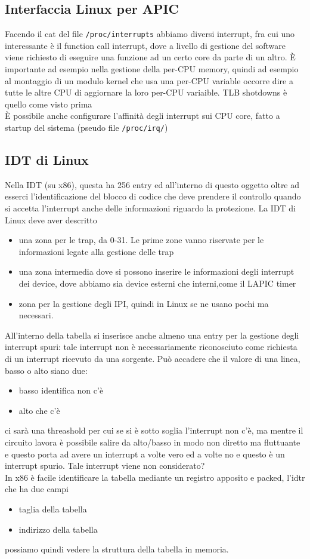 \documentclass[12pt, oneside]{extbook}
\begin{document}
\subsection{Interfaccia Linux per APIC}
Facendo il cat del file \texttt{/proc/interrupts} abbiamo diversi interrupt, fra cui uno interessante è il function call interrupt, dove a livello di gestione del software viene richiesto di eseguire una funzione ad un certo core da parte di un altro. È importante ad esempio nella gestione della per-CPU memory, quindi ad esempio al montaggio di un modulo kernel che usa una per-CPU variable occorre dire a tutte le altre CPU di aggiornare la loro per-CPU variaible. TLB shotdowns è quello come visto prima\\ È possibile anche configurare l'affinità degli interrupt sui CPU core, fatto a startup del sistema (pseudo file \texttt{/proc/irq/})
\subsection{IDT di Linux}
Nella IDT (su x86), questa ha 256 entry ed all'interno di questo oggetto oltre ad esserci l'identificazione del blocco di codice che deve prendere il controllo quando si accetta l'interrupt anche delle informazioni riguardo la protezione. La IDT di Linux deve aver descritto 
\begin{itemize}
\item una zona per le trap, da 0-31. Le prime zone vanno riservate per le informazioni legate alla gestione delle trap
\item una zona intermedia dove si possono inserire le informazioni degli interrupt dei device, dove abbiamo sia device esterni che interni,come il LAPIC timer
\item zona per la gestione degli IPI, quindi in Linux se ne usano pochi ma necessari.
\end{itemize}
All'interno della tabella si inserisce anche almeno una entry per la gestione degli interrupt spuri: tale interrupt non è necessariamente riconosciuto come richiesta di un interrupt ricevuto da una sorgente. Può accadere che il valore di una linea, basso o alto siano due:
\begin{itemize}
\item basso identifica non c'è
\item alto che c'è
\end{itemize}
ci sarà una threashold per cui se si è sotto soglia l'interrupt non c'è, ma mentre il circuito lavora è possibile salire da alto/basso in modo non diretto ma fluttuante e questo porta ad avere un interrupt a volte vero ed a volte no e questo è un interrupt spurio. Tale interrupt viene non considerato?\\In x86 è facile identificare la tabella mediante un registro apposito e packed, l'idtr che ha due campi
\begin{itemize}
\item taglia della tabella
\item indirizzo della tabella
\end{itemize}
possiamo quindi vedere la struttura della tabella in memoria.
\end{document}
